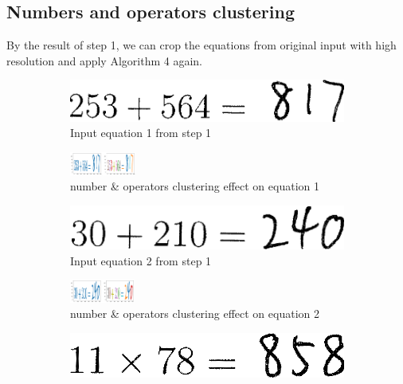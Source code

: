 \subsection{Numbers and operators clustering}
By the result of step 1, we can crop the equations from original input with high resolution and apply Algorithm 4 again.
\begin{figure}[htbp]
    \vspace{-1em}
    \centering
    \begin{subfigure}[t]{0.33\textwidth}
        \includegraphics[width=\textwidth]{../TestSamplePictures/test3.png}
        \caption{Input equation 1 from step 1}\label{fig11a}		
    \end{subfigure}
    \begin{subfigure}[t]{0.66\textwidth}
        \includegraphics[width=\textwidth,height=0.3in]{../TestSamplePictures/test3_result.png}
        \caption{number \& operators clustering effect on equation 1}\label{fig11b}
    \end{subfigure}
    \begin{subfigure}[t]{0.33\textwidth}
        \includegraphics[width=\textwidth]{../TestSamplePictures/test4.png}
        \caption{Input equation 2 from step 1}\label{fig11c}		
    \end{subfigure}
    \begin{subfigure}[t]{0.66\textwidth}
        \includegraphics[width=\textwidth,height=0.3in]{../TestSamplePictures/test4_result.png}
        \caption{number \& operators clustering effect on equation 2}\label{fig11d}
    \end{subfigure}
    \begin{subfigure}[t]{0.33\textwidth}
        \includegraphics[width=\textwidth]{../TestSamplePictures/test5.png}

\end{subfigure}
\end{figure}
